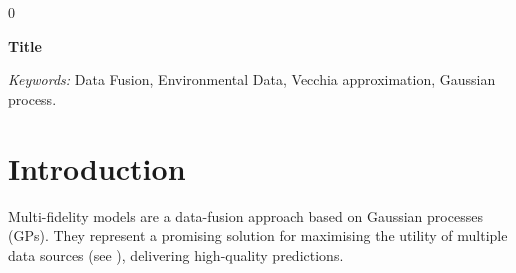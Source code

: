 \documentclass[12pt]{article}
\newcommand{\blind}{0}
\begin{document}
\blind
{
  \bigskip
  \bigskip
  \bigskip
  \begin{center}
    {\LARGE\bf Title}
\end{center}
  \medskip
} \fi

\bigskip
\begin{abstract}
We propose a new scalable framework for spatio-temporal data fusion with multi-fidelity Gaussian processes (MFGPs) that enables fully likelihood-based inference for both stationary and non-stationary fidelity integration. The framework is designed for environmental applications, where abundant but noisy low-fidelity data (e.g., satellite or reanalysis products) must be fused with sparse yet accurate high-fidelity in-situ observations to obtain high-resolution reconstructions. Our key methodological contribution is a decomposed multi-fidelity covariance formulation that allows the Vecchia approximation to be applied directly to the latent low-fidelity and discrepancy processes. Combined with a Woodbury-based reconstruction, this yields a numerically stable and computationally efficient evaluation of the joint marginal likelihood without ever forming the full multi-fidelity covariance matrix. In addition, we introduce a generalized least squares (GLS) mean-removal strategy with fidelity-specific offsets, preventing systematic biases from being absorbed into cross-fidelity dependence. We validate the proposed approach through extensive experiments on synthetic data and a large-scale real-world application to wind speed reconstruction in the Lombardy region of Italy. The results show that the proposed Vecchia-based MFGP closely matches exact multi-fidelity inference in controlled settings, while substantially outperforming standard single-fidelity spatio-temporal Gaussian processes in terms of predictive accuracy, correlation, and representation of local variability in realistic large-data scenarios.
\end{abstract}

\noindent%
{\it Keywords:}  Data Fusion, Environmental Data, Vecchia approximation, Gaussian process.
\vfill

\newpage
{} %
\section{Introduction}
\label{sec:intro}
Multi-fidelity models are a data-fusion approach based on Gaussian processes (GPs). They represent a promising solution for maximising the utility of multiple data sources 
(see \citealp{FernandezGodino2023,brevault2020overview}), delivering high-quality predictions.
\end{document}
